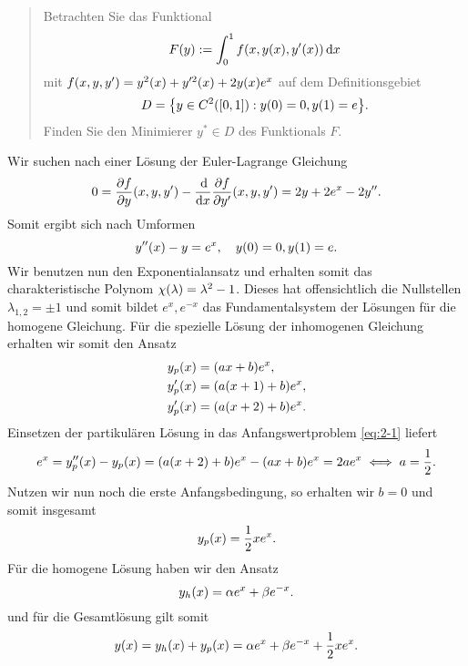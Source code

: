 \documentclass{exercise}
\begin{document}
	\section{}

	\begin{quote}
		Betrachten Sie das Funktional
		\[
			F\parentheses*{y} := \int_0^1 f\parentheses*{x, y\parentheses*{x}, y'\parentheses*{x}}\d x
		\]
		mit \(f\parentheses*{x, y, y'} = y^2\parentheses*{x} + y'^2\parentheses*{x} + 2y\parentheses*{x}e^x\) auf dem Definitionsgebiet
		\[
			D = \braces*{y \in C^2\parentheses*{\brackets*{0, 1}} : y\parentheses*{0} = 0, y\parentheses*{1} = e}.
		\]
		Finden Sie den Minimierer \(y^* \in D\) des Funktionals \(F\).
	\end{quote}

	Wir suchen nach einer Lösung der Euler-Lagrange Gleichung
	\[
		0 = \frac{\partial f}{\partial y}\parentheses*{x, y, y'} - \frac{\d}{\d x}\frac{\partial f}{\partial y'}\parentheses*{x, y, y'} = 2y + 2e^x - 2y''.
	\]
	Somit ergibt sich nach Umformen
	\begin{equation}\label{eq:2-1}
		y''\parentheses*{x} - y = e^x, \quad y\parentheses*{0} = 0, y\parentheses*{1} = e.
	\end{equation}
	Wir benutzen nun den Exponentialansatz und erhalten somit das charakteristische Polynom \(\chi\parentheses*{\lambda} = \lambda^2 - 1\).
	Dieses hat offensichtlich die Nullstellen \(\lambda_{1, 2} = \pm 1\) und somit bildet \(e^{x}, e^{-x}\) das Fundamentalsystem der Lösungen für die homogene Gleichung.
	Für die spezielle Lösung der inhomogenen Gleichung erhalten wir somit den Ansatz
	\begin{align*}
		y_p\parentheses*{x} &= \parentheses*{ax + b}e^x,\\
		y_p'\parentheses*{x} &= \parentheses*{a\parentheses*{x + 1} + b}e^x,\\
		y_p'\parentheses*{x} &= \parentheses*{a\parentheses*{x + 2} + b}e^x.
	\end{align*}
	Einsetzen der partikulären Lösung in das Anfangswertproblem \eqref{eq:2-1} liefert
	\[
		e^x = y_p''\parentheses*{x} - y_p\parentheses*{x} = \parentheses*{a\parentheses*{x + 2} + b}e^x - \parentheses*{ax + b}e^x = 2ae^x \iff a = \frac{1}{2}.
	\]
	Nutzen wir nun noch die erste Anfangsbedingung, so erhalten wir \(b = 0\) und somit insgesamt
	\[
		y_p\parentheses*{x} = \frac{1}{2}xe^x.
	\]
	Für die homogene Lösung haben wir den Ansatz
	\[
		y_h\parentheses*{x} = \alpha e^x + \beta e^{-x}.
	\]
	und für die Gesamtlösung gilt somit
	\[
		y\parentheses*{x} = y_h\parentheses*{x} + y_p\parentheses*{x} = \alpha e^x + \beta e^{-x} + \frac{1}{2}xe^x.
	\]
\end{document}
